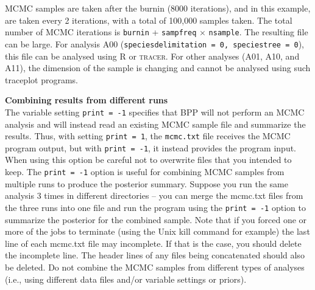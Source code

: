 \documentclass[a4paper]{book}
\numberwithin{equation}{section} \renewcommand{\baselinestretch}{0.55}
\begin{document}
MCMC samples are taken after the burnin (8000 iterations), and in this
example, are taken every 2 iterations, with a total of 100,000 samples
taken.  The total number of MCMC iterations is \texttt{burnin} +
\texttt{sampfreq} $\times$ \texttt{nsample}.  The resulting file can
be large.  For analysis A00 (\texttt{speciesdelimitation = 0,
  speciestree = 0}), this file can be analysed using R or
\textsc{tracer}.  For other analyses (A01, A10, and A11), the
dimension of the sample is changing and cannot be analysed using such
traceplot programs.

\begin{mdframed}
  \textbf{Combining results from different runs} \\
  The variable setting \texttt{print = -1} specifies that \textsc{BPP}
  will not perform an MCMC analysis and will instead read an existing
  MCMC sample file and summarize the results.  Thus, with setting
  \texttt{print = 1}, the \texttt{mcmc.txt} file receives the MCMC
  program output, but with \texttt{print = -1}, it instead provides
  the program input.  When using this option be careful not to
  overwrite files that you intended to keep.  The \texttt{print = -1}
  option is useful for combining MCMC samples from multiple runs to
  produce the posterior summary.  Suppose you run the same analysis 3
  times in different directories -- you can merge the mcmc.txt files
  from the three runs into one file and run the program using the
  \texttt{print = -1} option to summarize the posterior for the
  combined sample. Note that if you forced one or more of the jobs to
  terminate (using the Unix kill command for example) the last line of
  each mcmc.txt file may incomplete. If that is the case, you should
  delete the incomplete line. The header lines of any files being
  concatenated should also be deleted.  Do not combine the MCMC
  samples from different types of analyses (i.e., using different data
  files and/or variable settings or priors).
\end{mdframed}
\end{document}
